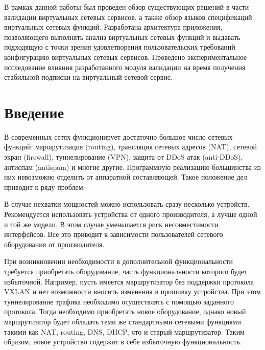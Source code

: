 \documentclass[oneside,final,14pt,a4paper]{extreport}
\begin{document}
В рамках данной работы был проведен обзор существующих решений в части валидации виртуальных сетевых сервисов, а также обзор языков спецификаций виртуальных сетевых функций. Разработана архитектура приложения, позволяющего выполнять анализ виртуальных сетевых функций и выдавать подходящую с точки зрения удовлетворения пользовательских требований конфигурацию виртуальных сетевых сервисов. Проведено экспериментальное исследование влияния разработанного модуля валидации на время получения стабильной подписки на виртуальный сетевой сервис.





\def\contentsname{Содержание} %
\tableofcontents %





\chapter*{Введение}
В современных сетях функционирует достаточно большое число сетевых функций: маршрутизация (routing), трансляция сетевых адресов (NAT), сетевой экран (firewall), туннелирование (VPN), защита от DDoS атак (anti-DDoS), антиспам (antispam) и многие другие. Программную реализацию большинства из них невозможно отделить от аппаратной составляющей. Такое положение дел приводит к ряду проблем. 

В случае нехватки мощностей можно использовать сразу несколько устройств. Рекомендуется использовать устройства от одного производителя, а лучше одной и той же модели. В этом случае уменьшается риск несовместимости интерфейсов. Все это приводит к зависимости пользователей сетевого оборудования от производителя.

При возникновении необходимости в дополнительной функциональности требуется приобретать оборудование, часть функциональности которого будет избыточной. Например, пусть имеется маршрутизатор без поддержки протокола VXLAN и нет возможности вносить изменения в прошивку устройства. При этом туннелирование трафика необходимо осуществлять с помощью заданного протокола. Тогда необходимо приобретать новое оборудование, однако новый маршрутизатор будет обладать теми же стандартными сетевыми функциями такими как NAT, routing, DNS, DHCP, что и старый маршрутизатор. Таким образом, новое устройство содержит в себе избыточную функциональность.
\end{document}
